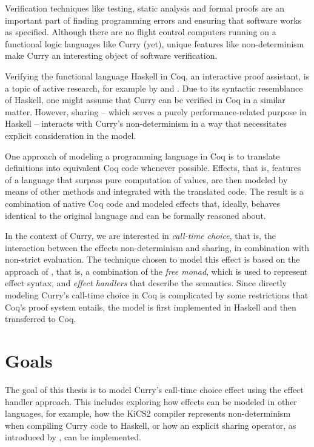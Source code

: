 \documentclass[a4paper, 11pt, fleqn, twoside, abstract=on]{scrreprt}
\begin{document}
Verification techniques like testing, static analysis and formal proofs are an important part of finding programming errors and ensuring that software works as specified.
Although there are no flight control computers running on a functional logic languages like Curry (yet), unique features like non-determinism make Curry an interesting object of software verification.

Verifying the functional language Haskell in Coq, an interactive proof assistant, is a topic of active research, for example by \citet{breitner2018ready} and \citet{dylus2019oneMonad}.
Due to its syntactic resemblance of Haskell, one might assume that Curry can be verified in Coq in a similar matter.
However, sharing -- which serves a purely performance-related purpose in Haskell -- interacts with Curry's non-determinism in a way that necessitates explicit consideration in the model.

One approach of modeling a programming language in Coq is to translate definitions into equivalent Coq code whenever possible.
Effects, that is, features of a language that surpass pure computation of values, are then modeled by means of other methods and integrated with the translated code.
The result is a combination of native Coq code and modeled effects that, ideally, behaves identical to the original language and can be formally reasoned about.

In the context of Curry, we are interested in \textit{call-time choice}, that is, the interaction between the effects non-determinism and sharing, in combination with non-strict evaluation.
The technique chosen to model this effect is based on the approach of \citet{wu2014effect}, that is, a combination of the \textit{free monad}, which is used to represent effect syntax, and \textit{effect handlers} that describe the semantics.
Since directly modeling Curry's call-time choice in Coq is complicated by some restrictions that Coq's proof system entails, the model is first implemented in Haskell and then transferred to Coq.

\section{Goals}

The goal of this thesis is to model Curry's call-time choice effect using the effect handler approach.
This includes exploring how effects can be modeled in other languages, for example, how the KiCS2 compiler represents non-determinism when compiling Curry code to Haskell, or how an explicit sharing operator, as introduced by \citet{fischer2009purely}, can be implemented.
\end{document}
